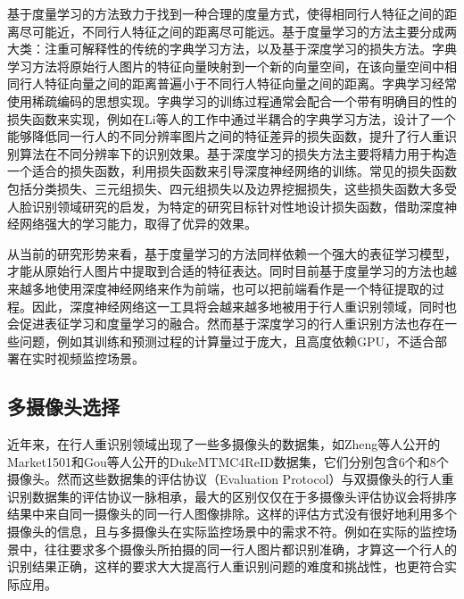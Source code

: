 基于度量学习的方法致力于找到一种合理的度量方式，使得相同行人特征之间的距离尽可能近，不同行人特征之间的距离尽可能远。基于度量学习的方法主要分成两大类：注重可解释性的传统的字典学习方法，以及基于深度学习的损失方法。字典学习方法将原始行人图片的特征向量映射到一个新的向量空间，在该向量空间中相同行人特征向量之间的距离普遍小于不同行人特征向量之间的距离。字典学习经常使用稀疏编码\cite{lee2007efficient}的思想实现。字典学习的训练过程通常会配合一个带有明确目的性的损失函数来实现，例如在Li等人\cite{li2018discriminative}的工作中通过半耦合的字典学习方法，设计了一个能够降低同一行人的不同分辨率图片之间的特征差异的损失函数，提升了行人重识别算法在不同分辨率下的识别效果。基于深度学习的损失方法主要将精力用于构造一个适合的损失函数，利用损失函数来引导深度神经网络的训练。常见的损失函数包括分类损失、三元组损失\cite{schroff2015facenet}、四元组损失\cite{chen2017beyond}以及边界挖掘损失\cite{xiao2017margin}，这些损失函数大多受人脸识别领域研究的启发，为特定的研究目标针对性地设计损失函数，借助深度神经网络强大的学习能力，取得了优异的效果。

从当前的研究形势来看，基于度量学习的方法同样依赖一个强大的表征学习模型，才能从原始行人图片中提取到合适的特征表达。同时目前基于度量学习的方法也越来越多地使用深度神经网络来作为前端，也可以把前端看作是一个特征提取的过程。因此，深度神经网络这一工具将会越来越多地被用于行人重识别领域，同时也会促进表征学习和度量学习的融合。然而基于深度学习的行人重识别方法也存在一些问题，例如其训练和预测过程的计算量过于庞大，且高度依赖GPU，不适合部署在实时视频监控场景。

\subsection{多摄像头选择}

近年来，在行人重识别领域出现了一些多摄像头的数据集，如Zheng等人公开的Market1501\cite{zheng2015scalable}和Gou等人公开的DukeMTMC4ReID\cite{gou2017dukemtmc4reid}数据集，它们分别包含6个和8个摄像头。然而这些数据集的评估协议（Evaluation Protocol）与双摄像头的行人重识别数据集的评估协议一脉相承，最大的区别仅仅在于多摄像头评估协议会将排序结果中来自同一摄像头的同一行人图像排除。这样的评估方式没有很好地利用多个摄像头的信息，且与多摄像头在实际监控场景中的需求不符。例如在实际的监控场景中，往往要求多个摄像头所拍摄的同一行人图片都识别准确，才算这一个行人的识别结果正确，这样的要求大大提高行人重识别问题的难度和挑战性，也更符合实际应用。

